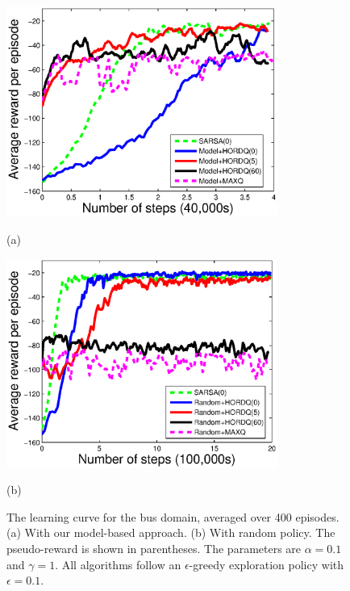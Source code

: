\begin{figure}[b]
 \begin{minipage}[b]{0.9\linewidth}
     \begin{center}
    \includegraphics[width=3.5in] {./figures/Approx.eps}
\end{center}
\end{minipage}
\begin{minipage}[b]{0.9\linewidth} \centering (a) \end{minipage}
\begin{minipage}[b]{0.9\linewidth}
     \begin{center}
    \includegraphics[width=3.5in] {./figures/Random.eps}
\end{center}
\end{minipage}
\begin{minipage}[b]{0.9\linewidth} \centering (b) \end{minipage}
\caption{The learning curve for the bus domain, averaged over 400 episodes. (a) With our model-based approach. (b) With random policy.
The pseudo-reward is shown in parentheses. The parameters are $\alpha=0.1$ and $\gamma=1$. All algorithms follow an $\epsilon$-greedy exploration policy
with $\epsilon = 0.1$.}
\label{fig:res}
\end{figure}


